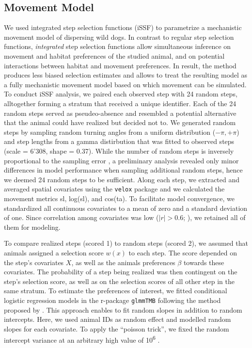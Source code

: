 \documentclass[abstract=on,10pt,a4paper,bibliography=totocnumbered]{article}
\begin{document}
\subsection{Movement Model}
We used integrated step selection functions (iSSF) to parametrize a mechanistic
movement model of dispersing wild dogs. In contrast to regular step selection
functions, \textit{integrated} step selection functions allow simultaneous
inference on movement and habitat preferences of the studied animal, and on
potential interactions between habitat and movement preferences. In result, the
method produces less biased selection estimates and allows to treat the
resulting model as a fully mechanistic movement model based on which movement
can be simulated. To conduct iSSF analysis, we paired each observed step with 24
random steps, alltogether forming a stratum that received a unique identifier.
Each of the 24 random steps served as pseudeo-absence and resembled a potential
alternative that the animal could have realized but decided not to. We generated
random steps by sampling random turning angles from a uniform distribution
(\(-\pi, +\pi\)) and step lengths from a gamma distirbution that was fitted to
observed steps (scale = 6'308, shape = 0.37). While the number of random steps
is inversely proportional to the sampling error \citep{Avgar.2016}, a
preliminary analysis revealed only minor differences in model performance when
sampling additional random steps, hence we deemed 24 random steps to be
sufficient. Along each step, we extracted and averaged spatial covariates using
the {\tt velox} package and we calculated the movement metrics \textsf{sl},
\textsf{log(sl)}, and \textsf{cos(ta)}. To facilitate model convergence, we
standardized all continuous covariates to a mean of zero and a standard
deviation of one. Since correlation among covariates was low (\(|r| > 0.6\);
\citealp{Latham.2011}), we retained all of them for modeling.

To compare realized steps (scored 1) to random steps (scored 2), we assumed that
animals assigned a selection score \(w(x)\) to each step. The score depended on
the step's covariates \(X\), as well as the animals preferences \(\beta\)
towards these covariates. The probability of a step being realized was then
contingent on the step's selection score, as well as on the selection scores of
all other step in the same stratum. To estimate the preferences of interest, we
fitted conditional logistic regression models in the r-package {\tt glmmTMB}
following the method proposed by \citep{Muff.2020}. This approach enables to fit
random slopes in addition to random intercepts. Here, we used animal IDs as
random effect and modelled random slopes for each covariate. To apply the
``poisson trick'', we fixed the random intercept variance at an arbitrary high
value of 10\textsuperscript{6} \citep{Muff.2020}.
\end{document}
